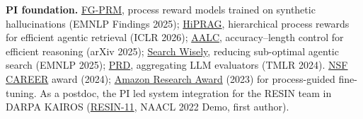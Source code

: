 \documentclass[11pt]{article}
\newcommand{\head}[1]{{\color{navy}\textbf{#1}}\enspace}
\begin{document}
\head{PI foundation.} \href{https://doi.org/10.18653/v1/2025.findings-emnlp.228}{FG-PRM}, process reward models trained on synthetic hallucinations (EMNLP Findings 2025); \href{https://arxiv.org/abs/2510.07794}{HiPRAG}, hierarchical process rewards for efficient agentic retrieval (ICLR 2026); \href{https://arxiv.org/abs/2506.20160}{AALC}, accuracy--length control for efficient reasoning (arXiv 2025); \href{https://doi.org/10.18653/v1/2025.emnlp-main.998}{Search Wisely}, reducing sub-optimal agentic search (EMNLP 2025); \href{https://arxiv.org/abs/2307.02762}{PRD}, aggregating LLM evaluators (TMLR 2024). \href{https://www.nsf.gov/awardsearch/showAward?AWD_ID=2340435}{NSF CAREER} award (2024); \href{https://www.amazon.science/research-awards/recipients/xinya-du}{Amazon Research Award} (2023) for process-guided fine-tuning. As a postdoc, the PI led system integration for the RESIN team in DARPA KAIROS (\href{https://doi.org/10.18653/v1/2022.naacl-demo.7}{\mbox{RESIN-11}}, NAACL 2022 Demo, first author).
\end{document}

